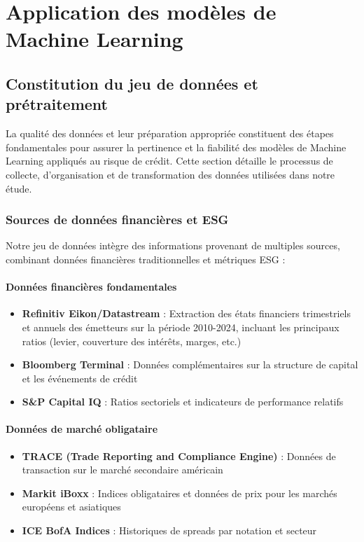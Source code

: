 \chapter{Application des modèles de Machine Learning}

\section{Constitution du jeu de données et prétraitement}

La qualité des données et leur préparation appropriée constituent des étapes fondamentales pour assurer la pertinence et la fiabilité des modèles de Machine Learning appliqués au risque de crédit. Cette section détaille le processus de collecte, d'organisation et de transformation des données utilisées dans notre étude.

\subsection{Sources de données financières et ESG}

Notre jeu de données intègre des informations provenant de multiples sources, combinant données financières traditionnelles et métriques ESG :

\subsubsection{Données financières fondamentales}
\begin{itemize}
  \item \textbf{Refinitiv Eikon/Datastream} : Extraction des états financiers trimestriels et annuels des émetteurs sur la période 2010-2024, incluant les principaux ratios (levier, couverture des intérêts, marges, etc.)
  \item \textbf{Bloomberg Terminal} : Données complémentaires sur la structure de capital et les événements de crédit
  \item \textbf{S\&P Capital IQ} : Ratios sectoriels et indicateurs de performance relatifs
\end{itemize}

\subsubsection{Données de marché obligataire}
\begin{itemize}
  \item \textbf{TRACE (Trade Reporting and Compliance Engine)} : Données de transaction sur le marché secondaire américain
  \item \textbf{Markit iBoxx} : Indices obligataires et données de prix pour les marchés européens et asiatiques
  \item \textbf{ICE BofA Indices} : Historiques de spreads par notation et secteur
\end{itemize}

